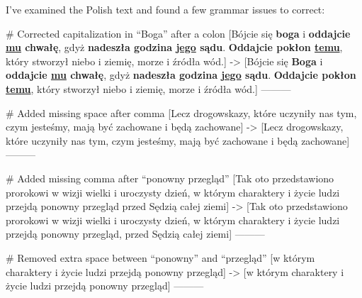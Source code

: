 I've examined the Polish text and found a few grammar issues to correct:

# Corrected capitalization in “Boga” after a colon
[Bójcie się \textbf{boga} i \textbf{oddajcie \underline{mu} chwałę}, gdyż \textbf{nadeszła godzina \underline{jego} sądu}. \textbf{Oddajcie pokłon \underline{temu}}, który stworzył niebo i ziemię, morze i źródła wód.]
->
[Bójcie się \textbf{Boga} i \textbf{oddajcie \underline{mu} chwałę}, gdyż \textbf{nadeszła godzina \underline{jego} sądu}. \textbf{Oddajcie pokłon \underline{temu}}, który stworzył niebo i ziemię, morze i źródła wód.]
---------

# Added missing space after comma
[Lecz  drogowskazy, które uczyniły nas tym, czym jesteśmy, mają być zachowane i będą zachowane]
->
[Lecz drogowskazy, które uczyniły nas tym, czym jesteśmy, mają być zachowane i będą zachowane]
---------

# Added missing comma after “ponowny przegląd”
[Tak oto przedstawiono prorokowi w wizji wielki i uroczysty dzień, w którym charaktery i życie ludzi przejdą ponowny  przegląd  przed Sędzią całej ziemi]
->
[Tak oto przedstawiono prorokowi w wizji wielki i uroczysty dzień, w którym charaktery i życie ludzi przejdą ponowny przegląd, przed Sędzią całej ziemi]
---------

# Removed extra space between “ponowny” and “przegląd”
[w którym charaktery i życie ludzi przejdą ponowny  przegląd]
->
[w którym charaktery i życie ludzi przejdą ponowny przegląd]
---------